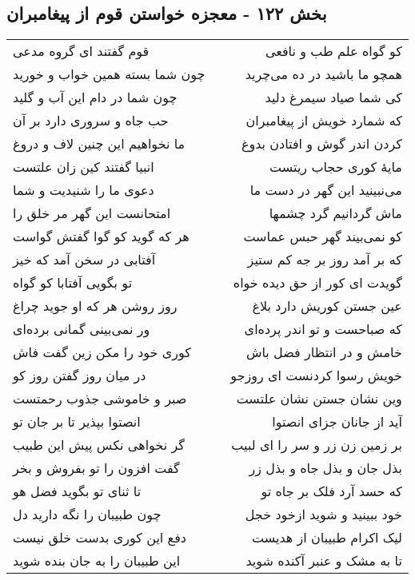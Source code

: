 \begin{center}
\section*{بخش ۱۲۲ - معجزه خواستن قوم از پیغامبران}
\label{sec:sh122}
\begin{longtable}{l p{0.5cm} r}
قوم گفتند ای گروه مدعی
&&
کو گواه علم طب و نافعی
\\
چون شما بسته همین خواب و خورید
&&
همچو ما باشید در ده می‌چرید
\\
چون شما در دام این آب و گلید
&&
کی شما صیاد سیمرغ دلید
\\
حب جاه و سروری دارد بر آن
&&
که شمارد خویش از پیغامبران
\\
ما نخواهیم این چنین لاف و دروغ
&&
کردن اندر گوش و افتادن بدوغ
\\
انبیا گفتند کین زان علتست
&&
مایهٔ کوری حجاب ریتست
\\
دعوی ما را شنیدیت و شما
&&
می‌نبینید این گهر در دست ما
\\
امتحانست این گهر مر خلق را
&&
ماش گردانیم گرد چشمها
\\
هر که گوید کو گوا گفتش گواست
&&
کو نمی‌بیند گهر حبس عماست
\\
آفتابی در سخن آمد که خیز
&&
که بر آمد روز بر جه کم ستیز
\\
تو بگویی آفتابا کو گواه
&&
گویدت ای کور از حق دیده خواه
\\
روز روشن هر که او جوید چراغ
&&
عین جستن کوریش دارد بلاغ
\\
ور نمی‌بینی گمانی برده‌ای
&&
که صباحست و تو اندر پرده‌ای
\\
کوری خود را مکن زین گفت فاش
&&
خامش و در انتظار فضل باش
\\
در میان روز گفتن روز کو
&&
خویش رسوا کردنست ای روزجو
\\
صبر و خاموشی جذوب رحمتست
&&
وین نشان جستن نشان علتست
\\
انصتوا بپذیر تا بر جان تو
&&
آید از جانان جزای انصتوا
\\
گر نخواهی نکس پیش این طبیب
&&
بر زمین زن زر و سر را ای لبیب
\\
گفت افزون را تو بفروش و بخر
&&
بذل جان و بذل جاه و بذل زر
\\
تا ثنای تو بگوید فضل هو
&&
که حسد آرد فلک بر جاه تو
\\
چون طبیبان را نگه دارید دل
&&
خود ببینید و شوید ازخود خجل
\\
دفع این کوری بدست خلق نیست
&&
لیک اکرام طبیبان از هدیست
\\
این طبیبان را به جان بنده شوید
&&
تا به مشک و عنبر آکنده شوید
\\
\end{longtable}
\end{center}
